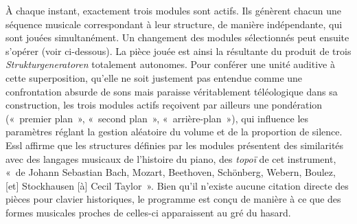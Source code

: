 \documentclass[a4paper,12pt]{article}
\newcommand{\guill}[1]{«~#1~»}
\begin{document}
À chaque instant, exactement trois modules sont actifs. Ils génèrent chacun une séquence musicale correspondant à leur structure, de manière indépendante, qui sont jouées simultanément. Un changement des modules sélectionnés peut ensuite s'opérer (voir ci-dessous). La pièce jouée est ainsi la résultante du produit de trois \emph{Strukturgeneratoren} totalement autonomes. Pour conférer une unité auditive à cette superposition, qu'elle ne soit justement pas entendue comme une confrontation absurde de sons mais paraisse véritablement téléologique dans sa construction, les trois modules actifs reçoivent par ailleurs une pondération (\guill{premier plan}, \guill{second plan}, \guill{arrière-plan}), qui influence les paramètres réglant la gestion aléatoire du volume et de la proportion de silence. Essl affirme que les structures définies par les modules présentent des similarités avec des langages musicaux de l'histoire du piano, des \emph{topo\"i} de cet instrument, \guill{de Johann Sebastian Bach, Mozart, Beethoven, Schönberg, Webern, Boulez, [et] Stockhausen [à] Cecil Taylor}. Bien qu'il n'existe aucune citation directe des pièces pour clavier historiques, le programme est conçu de manière à ce que des formes musicales proches de celles-ci apparaissent au gré du hasard.
\end{document}
